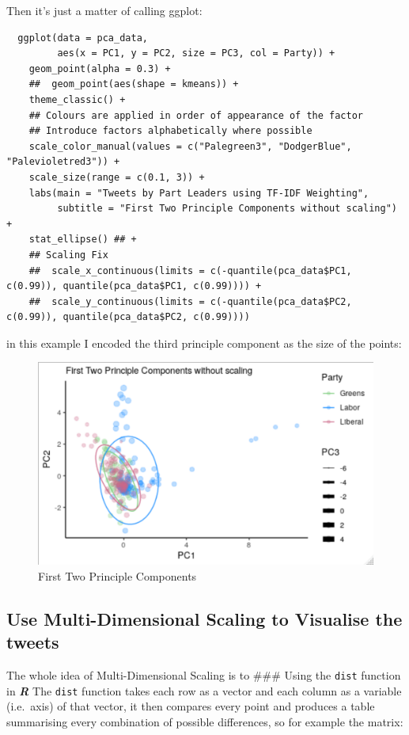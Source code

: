 \documentclass[11pt]{article}
\begin{document}
Then it's just a matter of calling ggplot:

\begin{verbatim}
  ggplot(data = pca_data,
         aes(x = PC1, y = PC2, size = PC3, col = Party)) +
    geom_point(alpha = 0.3) +
    ##  geom_point(aes(shape = kmeans)) +
    theme_classic() +
    ## Colours are applied in order of appearance of the factor
    ## Introduce factors alphabetically where possible
    scale_color_manual(values = c("Palegreen3", "DodgerBlue", "Palevioletred3")) +
    scale_size(range = c(0.1, 3)) +
    labs(main = "Tweets by Part Leaders using TF-IDF Weighting",
         subtitle = "First Two Principle Components without scaling") +
    stat_ellipse() ## +
    ## Scaling Fix
    ##  scale_x_continuous(limits = c(-quantile(pca_data$PC1, c(0.99)), quantile(pca_data$PC1, c(0.99)))) +
    ##  scale_y_continuous(limits = c(-quantile(pca_data$PC2, c(0.99)), quantile(pca_data$PC2, c(0.99))))

\end{verbatim}

in this example I encoded the third principle component as the size of
the points:

\begin{figure}[htbp]
\centering
\includegraphics[width=.9\linewidth]{media/20200423115557535_1624578072.png}
\caption{First Two Principle Components}
\end{figure}

\subsection{Use Multi-Dimensional Scaling to Visualise the tweets}
\label{sec:org60f49ca}
The whole idea of Multi-Dimensional Scaling is to \#\#\# Using the \texttt{dist}
function in \textbf{\emph{R}} The \texttt{dist} function takes each row as a vector and
each column as a variable (i.e. axis) of that vector, it then compares
every point and produces a table summarising every combination of
possible differences, so for example the matrix:
\end{document}

